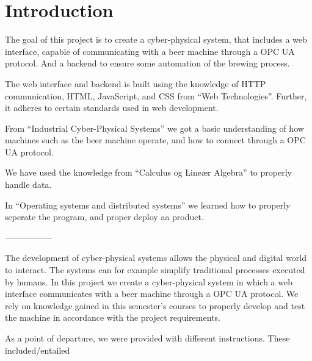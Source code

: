 \section{Introduction}

The goal of this project is to create a cyber-physical system, that includes a web interface, capable of communicating with a beer machine
through a OPC UA protocol. And a backend to ensure some automation of the brewing process.\newline

The web interface and backend is built using the knowledge of HTTP communication, HTML, JavaScript, and CSS from “Web Technologies”.
Further, it adheres to certain standards used in web development.

From “Industrial Cyber-Physical Systems” we got a basic understanding of how machines such as the beer machine operate,
and how to connect through a OPC UA protocol.

We have used the knowledge from “Calculus og Lineær Algebra” to properly handle data.

In “Operating systems and distributed systems” we learned how to properly seperate the program, and proper deploy aa product.

-----------------

The development of cyber-physical systems allows the physical and digital world to interact.
The systems can for example simplify traditional processes executed by humans.
In this project we create a cyber-physical system in which a web interface communicates with a beer machine through a OPC UA protocol.
We rely on knowledge gained in this semester's courses to properly develop and test the machine in accordance with the project requirements.

As a point of departure, we were provided with different instructions. These included/entailed
